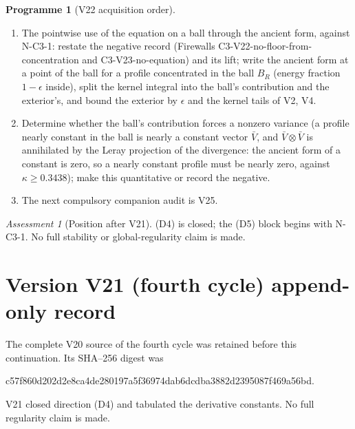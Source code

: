 \documentclass[11pt]{article}
\theoremstyle{plain}
\theoremstyle{definition}
\newtheorem{programme}[theorem]{Programme}
\theoremstyle{remark}
\newtheorem{assessment}[theorem]{Assessment}
\begin{document}
\begin{programme}[V22 acquisition order]
\label{prog:c4v22}
\begin{enumerate}[label=\textup{(AC\arabic*)},leftmargin=4.8em]
\item The pointwise use of the equation on a ball through the ancient
      form, against N-C3-1: restate the negative record (Firewalls
      C3-V22-no-floor-from-concentration and C3-V23-no-equation)
      and its lift; write the ancient form at a point of the ball for a
      profile concentrated in the ball \(B_R\) (energy fraction \(1-\epsilon\)
      inside), split the kernel integral into the ball's contribution
      and the exterior's, and bound the exterior by \(\epsilon\) and the
      kernel tails of V2, V4.
\item Determine whether the ball's contribution forces a nonzero
      variance (a profile nearly constant in the ball is nearly a
      constant vector \(\bar V\), and \(\bar V\otimes\bar V\) is annihilated by the
      Leray projection of the divergence: the ancient form of a
      constant is zero, so a nearly constant profile must be nearly
      zero, against \(\kappa\ge0.3438\)); make this quantitative or record the
      negative.
\item The next compulsory companion audit is V25.
\end{enumerate}
\end{programme}

\begin{assessment}[Position after V21]
\label{ass:c4v21-position}
(D4) is closed; the (D5) block begins with N-C3-1.  No full stability
or global-regularity claim is made.
\end{assessment}

\section*{Version V21 (fourth cycle) append-only record}

The complete V20 source of the fourth cycle was retained before this
continuation.  Its SHA--256 digest was
\begin{center}\scriptsize\ttfamily
c57f860d202d2e8ca4de280197a5f36974dab6dcdba3882d2395087f469a56bd.
\end{center}
V21 closed direction (D4) and tabulated the derivative constants.  No
full regularity claim is made.
\end{document}
